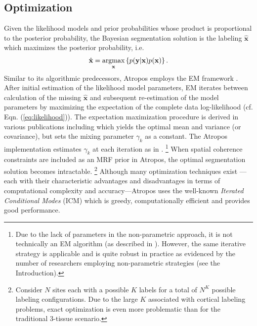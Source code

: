 \documentclass[11pt,english]{article}
\newcommand{\argmax}{\operatornamewithlimits{argmax}}
\begin{document}
\subsection{Optimization}
Given the likelihood models and prior probabilities whose product is proportional to the posterior probability, the Bayesian segmentation solution is the labeling $\hat{\mathbf{x}}$ which maximizes the posterior probability, i.e.
\begin{align}
  \hat{\mathbf{x}} = \argmax_{\mathbf{x}} \left\{p(\mathbf{y}|\mathbf{x})p(\mathbf{x})\right\}.
\end{align}
Similar to its algorithmic predecessors, Atropos employs the EM
framework \citep{Dempster1977}.  After initial estimation of the
likelihood model parameters, EM iterates between calculation of the missing $\hat{\mathbf{x}}$ and subsequent re-estimation of the model parameters by maximizing the expectation of the complete data log-likelihood (cf. Eqn. (\ref{eq:likelihood})).
The expectation maximization procedure is derived in various
publications including \cite{Zhang2001} which yields the optimal mean
and variance (or covariance), but sets the mixing parameter $\gamma_k$
as a constant.  The Atropos implementation estimates $\gamma_k$ at
each iteration as in \cite{Ashburner2005}.
\footnote{
Due to the lack of parameters in the non-parametric approach, it is not technically an EM algorithm (as described in \cite{Wells1996}).  However, the same iterative strategy is applicable and is quite robust in practice as evidenced by the number of researchers employing non-parametric strategies (see the Introduction).
}  
When spatial coherence constraints are included as an MRF prior in Atropos, the optimal segmentation solution becomes intractable.%
\footnote{
Consider $N$ sites each with a possible $K$ labels for a total of $N^K$ possible labeling configurations.  Due to the large $K$ associated with cortical labeling problems, exact optimization is even more problematic than for the traditional 3-tissue scenario.
}
Although many optimization techniques exist \citep[see the
introduction in][for a concise summary of the myriad optimization
possibilities]{Marroquin2002}---each with their characteristic
advantages and disadvantages in terms of computational complexity and
accuracy---Atropos uses the well-known {\em Iterated Conditional
  Modes} (ICM)  \citep{Besag1986} which is greedy, computationally efficient and provides good performance.
\end{document}
